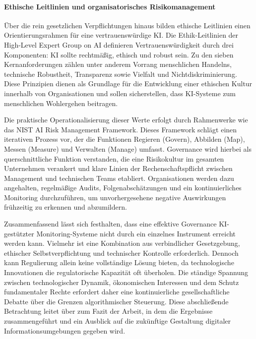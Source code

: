 \paragraph{Ethische Leitlinien und organisatorisches Risikomanagement}

Über die rein gesetzlichen Verpflichtungen hinaus bilden ethische Leitlinien einen Orientierungsrahmen für eine vertrauenswürdige \ac{KI}. Die Ethik-Leitlinien der High-Level Expert Group on AI definieren Vertrauenswürdigkeit durch drei Komponenten: \ac{KI} sollte rechtmäßig, ethisch und robust sein. Zu den sieben Kernanforderungen zählen unter anderem Vorrang menschlichen Handelns, technische Robustheit, Transparenz sowie Vielfalt und Nichtdiskriminierung. Diese Prinzipien dienen als Grundlage für die Entwicklung einer ethischen Kultur innerhalb von Organisationen und sollen sicherstellen, dass \ac{KI}-Systeme zum menschlichen Wohlergehen beitragen.

Die praktische Operationalisierung dieser Werte erfolgt durch Rahmenwerke wie das NIST AI Risk Management Framework. Dieses Framework schlägt einen iterativen Prozess vor, der die Funktionen Regieren (Govern), Abbilden (Map), Messen (Measure) und Verwalten (Manage) umfasst. Governance wird hierbei als querschnittliche Funktion verstanden, die eine Risikokultur im gesamten Unternehmen verankert und klare Linien der Rechenschaftspflicht zwischen Management und technischen Teams etabliert. Organisationen werden dazu angehalten, regelmäßige Audits, Folgenabschätzungen und ein kontinuierliches Monitoring durchzuführen, um unvorhergesehene negative Auswirkungen frühzeitig zu erkennen und abzumildern.

Zusammenfassend lässt sich festhalten, dass eine effektive Governance \ac{KI}-gestützter Monitoring-Systeme nicht durch ein einzelnes Instrument erreicht werden kann. Vielmehr ist eine Kombination aus verbindlicher Gesetzgebung, ethischer Selbstverpflichtung und technischer Kontrolle erforderlich. Dennoch kann Regulierung allein keine vollständige Lösung bieten, da technologische Innovationen die regulatorische Kapazität oft überholen. Die ständige Spannung zwischen technologischer Dynamik, ökonomischen Interessen und dem Schutz fundamentaler Rechte erfordert daher eine kontinuierliche gesellschaftliche Debatte über die Grenzen algorithmischer Steuerung. Diese abschließende Betrachtung leitet über zum Fazit der Arbeit, in dem die Ergebnisse zusammengeführt und ein Ausblick auf die zukünftige Gestaltung digitaler Informationsumgebungen gegeben wird.
